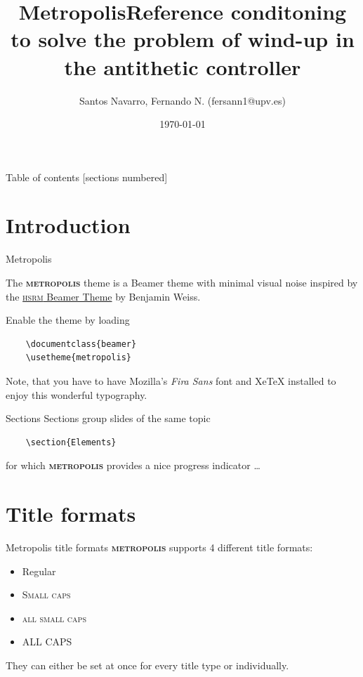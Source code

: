 \documentclass[10pt]{beamer}
\title{Metropolis}
\date{\today}
\author{Santos Navarro, Fernando N. (fersann1@upv.es)}
\institute{Universitat Polit\`ecnica de Val\`encia}
\title{Reference conditoning to solve the problem of wind-up in the antithetic controller}
\newcommand{\themename}{\textbf{\textsc{metropolis}}\xspace}
\begin{document}
\maketitle

\begin{frame}{Table of contents}
  [sections numbered]
  \tableofcontents[hideallsubsections]
\end{frame}

\section{Introduction}

\begin{frame}[fragile]{Metropolis}

  The \themename theme is a Beamer theme with minimal visual noise
  inspired by the \href{https://github.com/hsrmbeamertheme/hsrmbeamertheme}{\textsc{hsrm} Beamer
  Theme} by Benjamin Weiss.

  Enable the theme by loading

  \begin{verbatim}    \documentclass{beamer}
    \usetheme{metropolis}\end{verbatim}

    Note, that you have to have Mozilla's \emph{Fira Sans} font and XeTeX
    installed to enjoy this wonderful typography.
\end{frame}
\begin{frame}[fragile]{Sections}
  Sections group slides of the same topic

  \begin{verbatim}    \section{Elements}\end{verbatim}

  for which \themename provides a nice progress indicator \ldots
\end{frame}

\section{Title formats}

\begin{frame}{Metropolis title formats}
  \themename supports 4 different title formats:
  \begin{itemize}
    \item Regular
    \item \textsc{Small caps}
    \item \textsc{all small caps}
    \item ALL CAPS
  \end{itemize}
  They can either be set at once for every title type or individually.
\end{frame}
\end{document}
